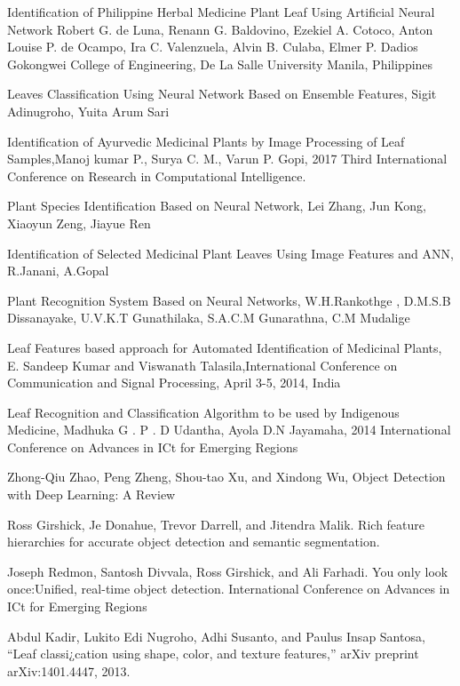 \clearpage
{}
\begin{thebibliography}{99}

Identification of Philippine Herbal Medicine Plant Leaf Using Artificial Neural Network Robert G. de Luna, Renann G. Baldovino, Ezekiel A. Cotoco, Anton Louise P. de Ocampo, Ira C. Valenzuela, Alvin B. Culaba, Elmer P. Dadios Gokongwei College of Engineering, De La Salle University Manila, Philippines

Leaves Classification Using Neural Network Based on Ensemble Features, Sigit Adinugroho, Yuita Arum Sari

Identification of Ayurvedic Medicinal Plants by Image Processing of Leaf Samples,Manoj kumar P., Surya C. M., Varun P. Gopi, 2017 Third International Conference on Research in Computational Intelligence.

Plant Species Identification Based on Neural Network, Lei Zhang, Jun Kong, Xiaoyun Zeng, Jiayue Ren

Identification of Selected Medicinal Plant Leaves Using Image Features and ANN, R.Janani, A.Gopal

Plant Recognition System Based on Neural Networks, W.H.Rankothge , D.M.S.B Dissanayake, U.V.K.T Gunathilaka, S.A.C.M Gunarathna, C.M Mudalige

Leaf Features based approach for Automated Identification of Medicinal Plants, E. Sandeep Kumar and Viswanath Talasila,International Conference on Communication and Signal Processing, April 3-5, 2014, India

Leaf Recognition and Classification Algorithm to be used by Indigenous Medicine, Madhuka G . P . D Udantha, Ayola D.N Jayamaha, 2014 International Conference on Advances in ICt for Emerging Regions

Zhong-Qiu Zhao, Peng Zheng, Shou-tao Xu, and Xindong Wu, Object Detection with Deep Learning: A Review

Ross Girshick, Je Donahue, Trevor Darrell, and Jitendra Malik. Rich feature hierarchies for accurate object detection and semantic segmentation.

Joseph Redmon, Santosh Divvala, Ross Girshick, and Ali Farhadi. You only look once:Unified, real-time object detection. International Conference on Advances in ICt for Emerging Regions

Abdul Kadir, Lukito Edi Nugroho, Adhi Susanto, and Paulus Insap
Santosa, “Leaf classi¿cation using shape, color, and texture features,”
arXiv preprint arXiv:1401.4447, 2013.


\end{thebibliography}
